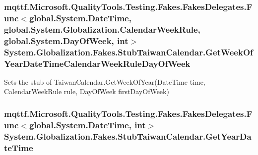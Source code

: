 \hypertarget{class_system_1_1_globalization_1_1_fakes_1_1_stub_taiwan_calendar_a424c42668cfb4eb94ee56eed912bdb91}{
\subsubsection[{Get\-Week\-Of\-Year\-Date\-Time\-Calendar\-Week\-Rule\-Day\-Of\-Week}]{\setlength{\rightskip}{0pt plus 5cm}mqttf.\-Microsoft.\-Quality\-Tools.\-Testing.\-Fakes.\-Fakes\-Delegates.\-Func$<$global.\-System.\-Date\-Time, global.\-System.\-Globalization.\-Calendar\-Week\-Rule, global.\-System.\-Day\-Of\-Week, int$>$ System.\-Globalization.\-Fakes.\-Stub\-Taiwan\-Calendar.\-Get\-Week\-Of\-Year\-Date\-Time\-Calendar\-Week\-Rule\-Day\-Of\-Week}}\label{class_system_1_1_globalization_1_1_fakes_1_1_stub_taiwan_calendar_a424c42668cfb4eb94ee56eed912bdb91}


Sets the stub of Taiwan\-Calendar.\-Get\-Week\-Of\-Year(\-Date\-Time time, Calendar\-Week\-Rule rule, Day\-Of\-Week first\-Day\-Of\-Week)

\hypertarget{class_system_1_1_globalization_1_1_fakes_1_1_stub_taiwan_calendar_a5870b106e4ea666ed76437959a554e29}{
\subsubsection[{Get\-Year\-Date\-Time}]{\setlength{\rightskip}{0pt plus 5cm}mqttf.\-Microsoft.\-Quality\-Tools.\-Testing.\-Fakes.\-Fakes\-Delegates.\-Func$<$global.\-System.\-Date\-Time, int$>$ System.\-Globalization.\-Fakes.\-Stub\-Taiwan\-Calendar.\-Get\-Year\-Date\-Time}}\label{class_system_1_1_globalization_1_1_fakes_1_1_stub_taiwan_calendar_a5870b106e4ea666ed76437959a554e29}



